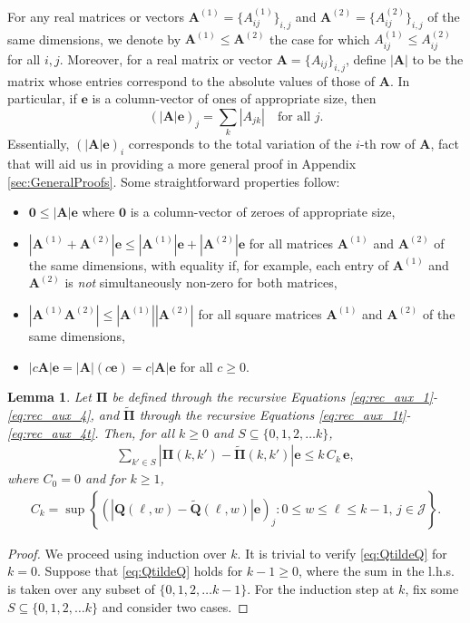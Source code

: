 \documentclass[11pt,leqno]{amsart}
\numberwithin{table}{section}
\numberwithin{figure}{section}
\numberwithin{equation}{section}
\newcommand{\1}{{\mathds{1}}}
\newcommand{\0}{\mat{0}}
\newtheorem{lemma}{Lemma}[section]
\newcommand{\tld}[1]{\widetilde{#1}}
\begin{document}
{For any real matrices or vectors $\bm{A}^{(1)}=\{A_{ij}^{(1)}\}_{i,j}$ and $\bm{A}^{(2)}=\{A_{ij}^{(2)}\}_{i,j}$ of the same dimensions, we denote by $\bm{A}^{(1)}\le \bm{A}^{(2)}$ the case for which $A_{ij}^{(1)}\le A_{ij}^{(2)}$ for all $i,j$.
Moreover, for a real matrix or vector $\bm{A}=\{A_{ij}\}_{i,j}$, define $|\bm{A}|$ to be the matrix whose entries correspond to the absolute values of those of $\bm{A}$. In particular, if $\bm{e}$ is a column-vector of ones of appropriate size, then
\[(|\bm{A}|\bm{e})_j=\sum_k |A_{jk}|\quad\text{for all } j.\]
Essentially, $(|\bm{A}|\bm{e})_i$ corresponds to { the total variation of the $i$-th row of $\bm{A}$, fact that will aid us in providing a more general proof in Appendix \ref{sec:GeneralProofs}}. Some straightforward properties follow:
\begin{itemize}
       \item $\bm{0}\le |\bm{A}|\bm{e}$ where $\bm{0}$ is a column-vector of zeroes of appropriate size,
       \item $|\bm{A}^{(1)} + \bm{A}^{(2)}|\bm{e}\le |\bm{A}^{(1)}|\bm{e} + |\bm{A}^{(2)}|\bm{e}$ for all matrices $\bm{A}^{(1)}$ and $\bm{A}^{(2)}$ of the same dimensions, with equality if, for example, each entry of $\bm{A}^{(1)}$ and $\bm{A}^{(2)}$ is \emph{not} simultaneously non-zero for both matrices,
       \item $|\bm{A}^{(1)} \bm{A}^{(2)}|\le |\bm{A}^{(1)}||\bm{A}^{(2)}|$ for all square matrices $\bm{A}^{(1)}$ and $\bm{A}^{(2)}$ of the same dimensions,
       \item $|c\bm{A}|\bm{e} = |\bm{A}|(c\bm{e}) = c|\bm{A}|\bm{e}$ for all $c\ge 0$.
\end{itemize}

\begin{lemma}\label{lem:boundPi}
Let $\bm{\Pi}$ be defined through the recursive Equations \ref{eq:rec_aux_1}-\ref{eq:rec_aux_4}, and $\tld{\bm{\Pi}}$  through the recursive Equations \ref{eq:rec_aux_1t}-\ref{eq:rec_aux_4t}. Then, for all $k\ge 0$ and $S\subseteq \{0,1,2,\dots k\}$,
\begin{align}
\sum_{k'\in S} \left|{\bm{\Pi}}(k,k')-\tld{\bm{\Pi}}(k,k')\right|\bm{e}\le k\,C_k\,\bm{e},\label{eq:QtildeQ}
\end{align}
where $C_0=0$ and for $k\ge 1$,
\begin{align}
C_k=\sup\left\{\left(\left|\bm{Q}(\ell,w)-\tld{\bm{Q}}(\ell,w)\right|\bm{e}\right)_j: 0\le w\le \ell\le k-1,\,j\in\mathcal{J}\right\}.\label{eq:defCk}
\end{align}
\end{lemma}
\begin{proof}
We proceed using induction over $k$. It is trivial to verify \eqref{eq:QtildeQ} for $k=0$. Suppose that \eqref{eq:QtildeQ} holds for $k-1\ge 0$, where the sum in the l.h.s. is taken over any subset of $\{0,1,2,\dots k-1\}$. For the induction step at $k$, fix some $S\subseteq\{0,1,2,\dots k\}$ and consider two cases.


\end{proof}}
\end{document}
